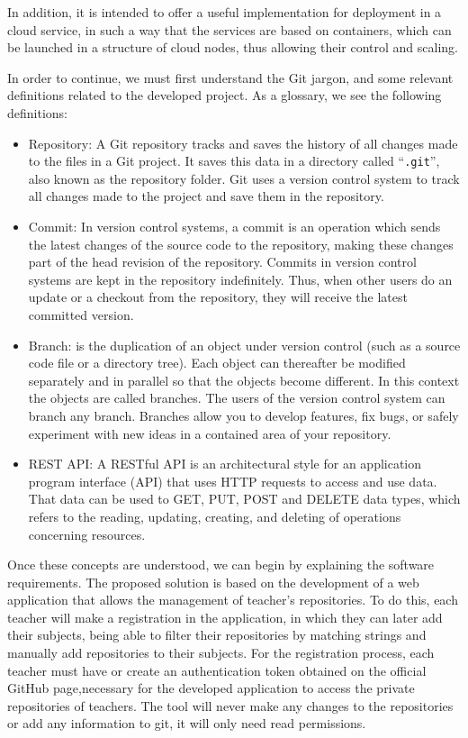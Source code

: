 In addition, it is intended to offer a useful implementation for deployment
in a cloud service, in such a way that the services are based on
containers, which can be launched in a structure of cloud nodes, thus
allowing their control and scaling.

In order to continue, we must first understand the Git jargon, and some
relevant definitions related to the developed project. As a glossary, we
see the following definitions:

\begin{itemize}
\item Repository: A Git repository tracks and saves the history of all
  changes made to the files in a Git project. It saves this data in a
  directory called ``\texttt{.git}'', also known as the
  repository folder. Git uses a version control system to track all
  changes made to the project and save them in the repository.

\item Commit: In version control systems, a commit is an operation which
  sends the latest changes of the source code to the repository, making
  these changes part of the head revision of the repository. Commits in
  version control systems are kept in the repository indefinitely. Thus,
  when other users do an update or a checkout from the repository, they
  will receive the latest committed version.

\item Branch: is the duplication of an object under version control (such
  as a source code file or a directory tree). Each object can thereafter be
  modified separately and in parallel so that the objects become different.
  In this context the objects are called branches. The users of the version
  control system can branch any branch. Branches allow you to develop
  features, fix bugs, or safely experiment with new ideas in a contained
  area of your repository.

\item REST API: A RESTful API is an architectural style for an application
  program interface (API) that uses HTTP requests to access and use data.
  That data can be used to GET, PUT, POST and DELETE data types, which
  refers to the reading, updating, creating, and deleting of operations
  concerning resources.
\end{itemize}

Once these concepts are understood, we can begin by explaining the software
requirements. The proposed solution is based on the development of a web
application that allows the management of teacher’s repositories. To do
this, each teacher will make a registration in the application, in which
they can later add their subjects, being able to filter their repositories
by matching strings and manually add repositories to their subjects. For
the registration process, each teacher must have or create an
authentication token obtained on the official GitHub page,necessary for the
developed application to access the private repositories of teachers. The
tool will never make any changes to the repositories or add any information
to git, it will only need read permissions.

